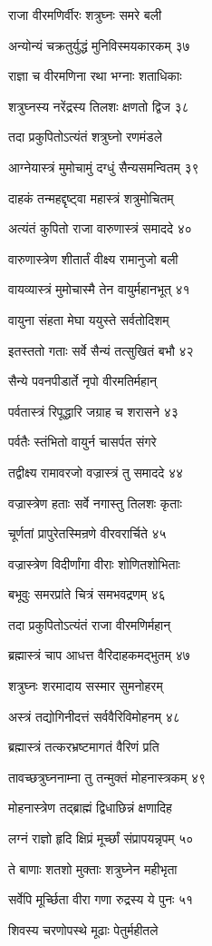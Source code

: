 राजा वीरमणिर्वीरः शत्रुघ्नः समरे बली

अन्योन्यं चक्रतुर्युद्धं मुनिविस्मयकारकम् ३७

राज्ञा च वीरमणिना रथा भग्नाः शताधिकाः

शत्रुघ्नस्य नरेंद्रस्य तिलशः क्षणतो द्विज ३८

तदा प्रकुपितोऽत्यंतं शत्रुघ्नो रणमंडले

आग्नेयास्त्रं मुमोचामुं दग्धुं सैन्यसमन्वितम् ३९

दाहकं तन्महद्दृष्ट्वा महास्त्रं शत्रुमोचितम्

अत्यंतं कुपितो राजा वारुणास्त्रं समाददे ४०

वारुणास्त्रेण शीतार्तं वीक्ष्य रामानुजो बली

वायव्यास्त्रं मुमोचास्मै तेन वायुर्महानभूत् ४१

वायुना संहता मेघा ययुस्ते सर्वतोदिशम्

इतस्ततो गताः सर्वे सैन्यं तत्सुखितं बभौ ४२

सैन्ये पवनपीडार्ते नृपो वीरमतिर्महान्

पर्वतास्त्रं रिपूद्धारि जग्राह च शरासने ४३

पर्वतैः स्तंभितो वायुर्न चासर्पत संगरे

तद्वीक्ष्य रामावरजो वज्रास्त्रं तु समाददे ४४

वज्रास्त्रेण हताः सर्वे नगास्तु तिलशः कृताः

चूर्णतां प्रापुरेतस्मिन्रणे वीरवरार्चिते ४५

वज्रास्त्रेण विदीर्णांगा वीराः शोणितशोभिताः

बभूवुः समरप्रांते चित्रं समभवद्रणम् ४६

तदा प्रकुपितोऽत्यंतं राजा वीरमणिर्महान्

ब्रह्मास्त्रं चाप आधत्त वैरिदाहकमद्भुतम् ४७

शत्रुघ्नः शरमादाय सस्मार सुमनोहरम्

अस्त्रं तद्योगिनीदत्तं सर्ववैरिविमोहनम् ४८

ब्रह्मास्त्रं तत्करभ्रष्टमागतं वैरिणं प्रति

तावच्छत्रुघ्ननाम्ना तु तन्मुक्तं मोहनास्त्रकम् ४९

मोहनास्त्रेण तद्ब्राह्मं द्विधाछिन्नं क्षणादिह

लग्नं राज्ञो हृदि क्षिप्रं मूर्च्छां संप्रापयन्नृपम् ५०

ते बाणाः शतशो मुक्ताः शत्रुघ्नेन महीभृता

सर्वेपि मूर्च्छिता वीरा गणा रुद्रस्य ये पुनः ५१

शिवस्य चरणोपस्थे मूढाः पेतुर्महीतले

